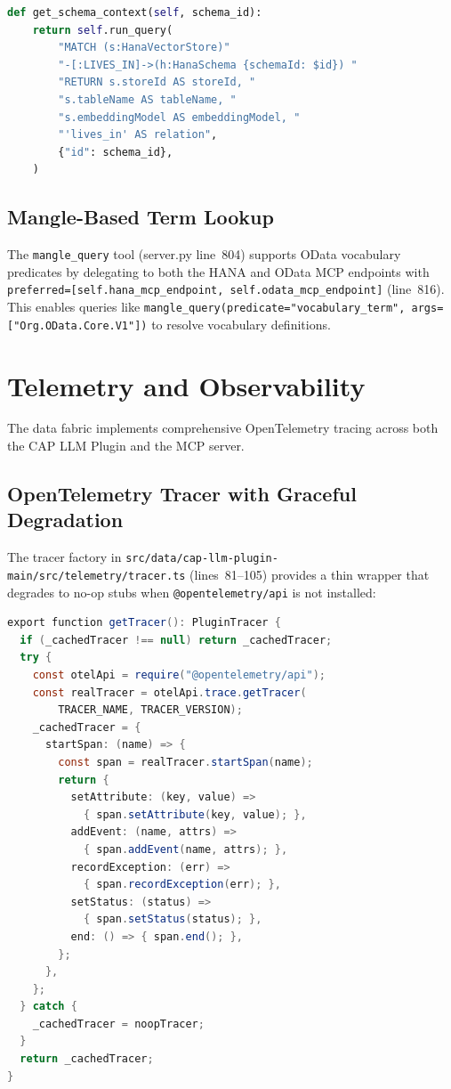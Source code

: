 \documentclass[11pt]{article}
\newcommand{\filepath}[1]{\texttt{#1}}
\newcommand{\code}[1]{\texttt{#1}}
\begin{document}
\begin{lstlisting}[language=Python,caption={Schema context query (kuzu\_store.py lines 208--217)},label=lst:schema-ctx]
def get_schema_context(self, schema_id):
    return self.run_query(
        "MATCH (s:HanaVectorStore)"
        "-[:LIVES_IN]->(h:HanaSchema {schemaId: $id}) "
        "RETURN s.storeId AS storeId, "
        "s.tableName AS tableName, "
        "s.embeddingModel AS embeddingModel, "
        "'lives_in' AS relation",
        {"id": schema_id},
    )
\end{lstlisting}

\subsection{Mangle-Based Term Lookup}

The \code{mangle\_query} tool (server.py line~804) supports OData
vocabulary predicates by delegating to both the HANA and OData MCP
endpoints with \code{preferred=[self.hana\_mcp\_endpoint, self.odata\_mcp\_endpoint]}
(line~816).  This enables queries like
\code{mangle\_query(predicate="vocabulary\_term", args=["Org.OData.Core.V1"])}
to resolve vocabulary definitions.


\section{Telemetry and Observability}
\label{sec:telemetry}

The data fabric implements comprehensive OpenTelemetry tracing across
both the CAP LLM Plugin and the MCP server.

\subsection{OpenTelemetry Tracer with Graceful Degradation}

The tracer factory in
\filepath{src/data/cap-llm-plugin-main/src/telemetry/tracer.ts}
(lines~81--105) provides a thin wrapper that degrades to no-op stubs
when \code{@opentelemetry/api} is not installed:

\begin{lstlisting}[language=Java,caption={Tracer factory (tracer.ts lines 81--105)},label=lst:tracer]
export function getTracer(): PluginTracer {
  if (_cachedTracer !== null) return _cachedTracer;
  try {
    const otelApi = require("@opentelemetry/api");
    const realTracer = otelApi.trace.getTracer(
        TRACER_NAME, TRACER_VERSION);
    _cachedTracer = {
      startSpan: (name) => {
        const span = realTracer.startSpan(name);
        return {
          setAttribute: (key, value) =>
            { span.setAttribute(key, value); },
          addEvent: (name, attrs) =>
            { span.addEvent(name, attrs); },
          recordException: (err) =>
            { span.recordException(err); },
          setStatus: (status) =>
            { span.setStatus(status); },
          end: () => { span.end(); },
        };
      },
    };
  } catch {
    _cachedTracer = noopTracer;
  }
  return _cachedTracer;
}
\end{lstlisting}
\end{document}
